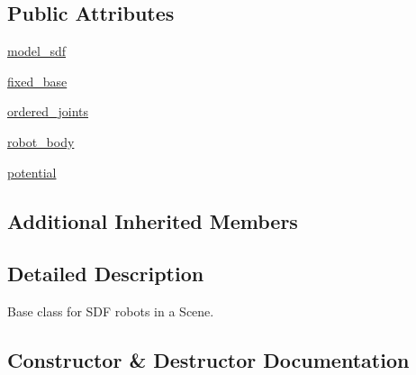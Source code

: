 \subsection*{Public Attributes}
\begin{DoxyCompactItemize}
\item 
\hyperlink{classpybullet-gym_1_1pybulletgym_1_1envs_1_1roboschool_1_1robots_1_1robot__bases_1_1_s_d_f_based_robot_ab0d6e89ed91a5531b99e022dff1e989a}{model\+\_\+sdf}
\item 
\hyperlink{classpybullet-gym_1_1pybulletgym_1_1envs_1_1roboschool_1_1robots_1_1robot__bases_1_1_s_d_f_based_robot_a1f91f56c1e90a437452ee0a175c4fb5c}{fixed\+\_\+base}
\item 
\hyperlink{classpybullet-gym_1_1pybulletgym_1_1envs_1_1roboschool_1_1robots_1_1robot__bases_1_1_s_d_f_based_robot_a4f88a97d50a144a299e37c47b2dbfca1}{ordered\+\_\+joints}
\item 
\hyperlink{classpybullet-gym_1_1pybulletgym_1_1envs_1_1roboschool_1_1robots_1_1robot__bases_1_1_s_d_f_based_robot_ab58fe4afef4f734804e3608cdc373e52}{robot\+\_\+body}
\item 
\hyperlink{classpybullet-gym_1_1pybulletgym_1_1envs_1_1roboschool_1_1robots_1_1robot__bases_1_1_s_d_f_based_robot_aaa477f63a2dfdb70bce8cc01ac0c44fd}{potential}
\end{DoxyCompactItemize}
\subsection*{Additional Inherited Members}


\subsection{Detailed Description}
\begin{DoxyVerb}Base class for SDF robots in a Scene.
\end{DoxyVerb}
 

\subsection{Constructor \& Destructor Documentation}
